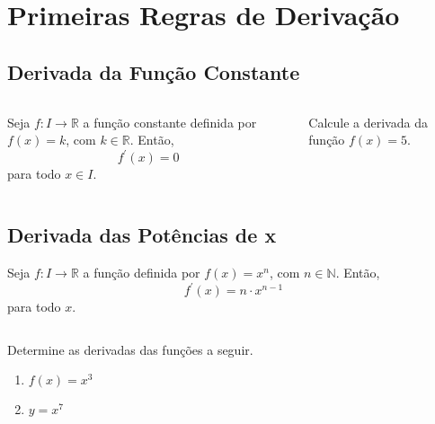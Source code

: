 \section{Primeiras Regras de Derivação}
\subsection{Derivada da Função Constante}
\begin{frame}
  \begin{columns}[onlytextwidth]
    \begin{column}{0.5\textwidth}\vspace{-0.5cm}
      \begin{theorem}
        Seja $f:I\rightarrow\mathbb{R}$ a função constante definida por $f(x) = k$, com $k\in\mathbb{R}$. Então, 
        \begin{equation*}
          f^{\prime}(x) = 0
        \end{equation*}
        para todo $x\in I$.
      \end{theorem}
    \end{column}
    \begin{column}{0.48\textwidth}\vspace{-0.5cm}
      \begin{example-highlight}
        Calcule a derivada da função $f(x) = 5$.
      \end{example-highlight}
    \end{column}
  \end{columns}
\end{frame}

\subsection{Derivada das Potências de x}
\begin{frame}
  \begin{theorem}
    Seja $f:I\rightarrow\mathbb{R}$ a função definida por $f(x) = x^{n}$, com $n\in\mathbb{N}$. Então, 
    \begin{equation*}
      f^{\prime}(x) = n\cdot x^{n-1}
    \end{equation*}
    para todo $x$.
  \end{theorem}
  \begin{columns}[onlytextwidth]
    \begin{column}{0.55\textwidth}
      \begin{example-highlight}
        Determine as derivadas das funções a seguir.
        \begin{enumerate}
          \item $f(x) = x^{3}$
          \item $y = x^{7}$
        \end{enumerate}
      \end{example-highlight}
    \end{column}
    \begin{column}{0.43\textwidth}\vspace{-0.6cm}
    \end{column}
  \end{columns}
\end{frame}

